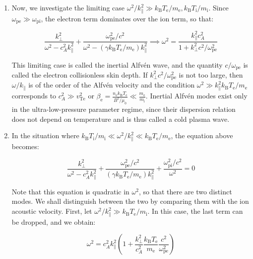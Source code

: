 \begin{enumerate}
    \item Now, we investigate the limiting case $\omega^2/k_\parallel^2\gg k_\mathrm{B}T_\text{e}/m_\text{e}, k_\mathrm{B}T_\mathrm{i}/m_\mathrm{i}$. Since $\omega_\text{pe}\gg\omega_\text{pi}$, the electron term dominates over the ion term, so that:
    
    \begin{equation}
        \frac{k_\perp^2}{\omega^2-c_A^2k_\parallel^2}+\frac{\omega_\text{pe}^2/c^2}{\omega^2-(\gamma k_\mathrm{B}T_\text{e}/m_\text{e})k_\parallel^2}\implies\omega^2=\frac{k_\parallel^2c_A^2}{1+k_\perp^2c^2/\omega_\text{pe}^2}
    \end{equation}
    
    This limiting case is called the inertial Alfvén wave, and the quantity $c/\omega_\text{pe}$ is called the electron collisionless skin depth. If $k_\perp^2c^2/\omega_\text{pe}^2$ is not too large, then $\omega/k_\parallel$ is of the order of the Alfvén velocity and the condition $\omega^2\gg k_\parallel^2k_\mathrm{B}T_\text{e}/m_\text{e}$ corresponds to $c_A^2\gg v_\text{Te}^2$ or $\beta_\text{e}=\frac{n_\text{e}k_\mathrm{B}T_\text{e}}{B^2/\mu_0}\ll\frac{m_\text{e}}{m_\mathrm{i}}$. Inertial Alfvén modes exist only in the ultra-low-pressure parameter regime, since their dispersion relation does not depend on temperature and is thus called a cold plasma wave.

    \item In the situation where $k_\mathrm{B}T_\mathrm{i}/m_\mathrm{i}\ll \omega^2/k_\parallel^2\ll k_\mathrm{B}T_\text{e}/m_\text{e}$, the equation above becomes:
    
    \begin{equation}
        \frac{k_\perp^2}{\omega^2-c_A^2k_\parallel^2}+\frac{\omega_\text{pe}^2/c^2}{(\gamma k_\mathrm{B}T_\text{e}/m_\text{e})k_\parallel^2}+\frac{\omega_\text{pi}^2/c^2}{\omega^2}=0
    \end{equation}
    
    Note that this equation is quadratic in $\omega^2$, so that there are two distinct modes. We shall distinguish between the two by comparing them with the ion acoustic velocity. First, let $\omega^2/k_\parallel^2\gg k_\mathrm{B}T_\text{e}/m_\mathrm{i}$. In this case, the last term can be dropped, and we obtain:
    
    \begin{equation}
        \omega^2=c_A^2k_\parallel^2\left(1+\frac{k_\perp^2}{c_A^2}\frac{k_\mathrm{B}T_\text{e}}{m_\text{e}}\frac{c^2}{\omega_\text{pe}^2}\right)
    \end{equation}
    

\end{enumerate}
